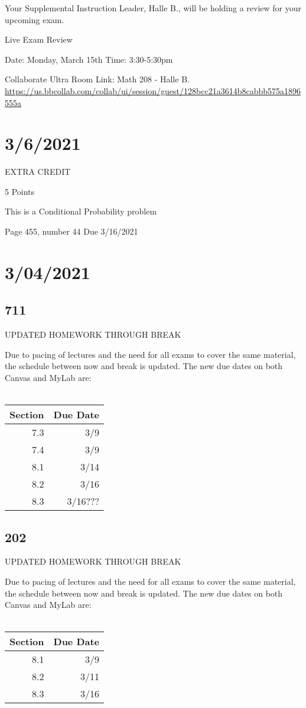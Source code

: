 \documentclass[]{article}
\begin{document}
Your Supplemental Instruction Leader, Halle B., will be holding a review for your upcoming exam.

Live Exam Review 

Date: Monday, March 15th
Time: 3:30-5:30pm

Collaborate Ultra Room Link: Math 208 - Halle B.
\url{https://us.bbcollab.com/collab/ui/session/guest/128bcc21a3614b8cabbb575a1896555a}



\section*{3/6/2021}
EXTRA CREDIT

5 Points

This is a Conditional Probability problem

Page 455, number 44
Due 3/16/2021
	
\section*{3/04/2021}
\subsection*{711}
UPDATED HOMEWORK THROUGH BREAK

Due to pacing of lectures and the need for all exams to cover the same material, the schedule between now and break is updated. The new due dates on both Canvas and MyLab are:\\\\
\bgroup
\def\arraystretch{1.5}
\begin{tabular}{|r|r|}
	\hline
	Section & Due Date \\
	\hline
	7.3 & 3/9 \\
	\hline
	7.4 & 3/9 \\
	\hline
	8.1 & 3/14 \\
	\hline
	8.2 & 3/16 \\
	\hline
	8.3 & 3/16??? \\
	\hline
\end{tabular}
\egroup

\subsection*{202}
UPDATED HOMEWORK THROUGH BREAK

Due to pacing of lectures and the need for all exams to cover the same material, the schedule between now and break is updated. The new due dates on both Canvas and MyLab are:\\\\
\bgroup
\def\arraystretch{1.5}
\begin{tabular}{|r|r|}
	\hline
	Section & Due Date \\
	\hline
	8.1 & 3/9 \\
	\hline
	8.2 & 3/11 \\
	\hline
	8.3 & 3/16 \\
	\hline
\end{tabular}
\egroup
\end{document}
